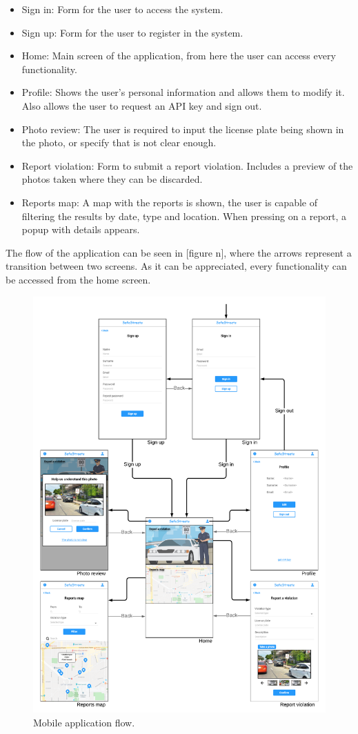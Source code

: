 \begin{itemize}
\item
Sign in: Form for the user to access the system.
\item
Sign up: Form for the user to register in the system.
\item
Home: Main screen of the application, from here the user can access every functionality.
\item
Profile: Shows the user's personal information and allows them to modify it. Also allows the user to request an API key and sign out.
\item
Photo review: The user is required to input the license plate being shown in the photo, or specify that is not clear enough.
\item
Report violation: Form to submit a report violation. Includes a preview of the photos taken where they can be discarded.
\item
Reports map: A map with the reports is shown, the user is capable of filtering the results by date, type and location. When pressing on a report, a popup with details appears.
\end{itemize}

The flow of the application can be seen in [figure n], where the arrows represent a transition between two screens. As it can be appreciated, every functionality can be accessed from the home screen.

\begin{figure}[H]
\centering
\includegraphics[width=\textwidth]{Images/mobile-flow.png}
\caption{\label{fig:api-usage}Mobile application flow.}
\end{figure}
